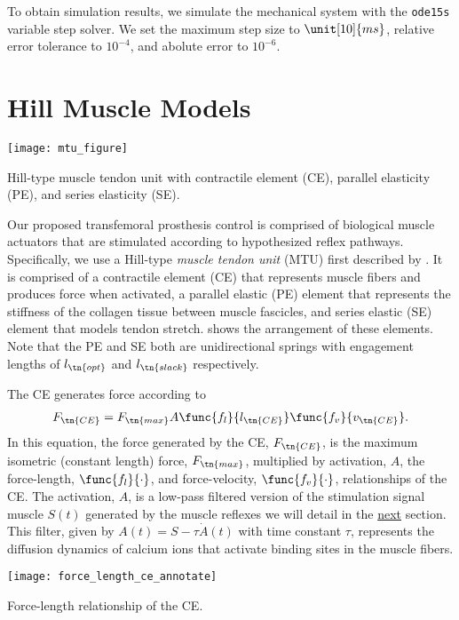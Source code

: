 To obtain simulation results, we simulate the mechanical system with the
\verb+ode15s+
variable step solver. We set the maximum step size to $\unit[10]{ms}$, relative
error tolerance to $10^{-4}$, and abolute error to $10^{-6}$.

\section{Hill Muscle Models}\label{sec:neuro_hill_muscle}
\begin{marginfigure}[-0.25in]
    \centering
    \texttt{[image: mtu\_figure]}
    \vspace{-0.4in}
    \caption{Hill-type muscle tendon unit with contractile element (CE),
    parallel elasticity (PE), and series elasticity (SE).}
    \label{fig:hill_type_mtu}
\end{marginfigure}
Our proposed transfemoral prosthesis control is comprised of biological muscle
actuators that are stimulated according to hypothesized reflex pathways.
Specifically, we use a Hill-type \emph{muscle tendon unit} (MTU) first described
by \citet{hill1938heat}. It is comprised of a contractile element (CE) that
represents muscle fibers and produces force when activated, a parallel elastic
(PE) element that represents the stiffness of the collagen tissue between muscle
fascicles, and series elastic (SE) element that models tendon stretch.
 shows the arrangement of these elements. Note that the
PE and SE both are unidirectional springs with engagement lengths of
$l_\tn{opt}$ and $l_\tn{slack}$ respectively.

The CE generates force according to
\begin{align}
    F_\tn{CE} = F_\tn{max} A \func{f_l}{l_\tn{CE}} \func{f_v}{v_\tn{CE}}.
    \label{eq:hill_ce}
\end{align}
In this equation, the force generated by the CE, $F_\tn{CE}$, is the maximum
isometric (constant length) force, $F_\tn{max}$, multiplied by activation, $A$,
the force-length, $\func{f_l}{\cdot}$, and force-velocity, $\func{f_v}{\cdot}$,
relationships of the CE\@. The activation, $A$, is a low-pass filtered version
of the stimulation signal muscle $S(t)$ generated by the muscle reflexes we will
detail in the \hyperref[sec:neuro_stance_reflexes]{next} section. This filter,
given by $A(t) = S - \tau \dot A(t)$ with time constant $\tau$, represents the
diffusion dynamics of calcium ions that activate binding sites in the muscle
fibers.
\begin{marginfigure}[-1in]
    \centering
    \texttt{[image: force\_length\_ce\_annotate]}
    \vspace{-0.25in}
    \caption{Force-length relationship of the CE.}
    \label{fig:force_length_ce}
\end{marginfigure}

